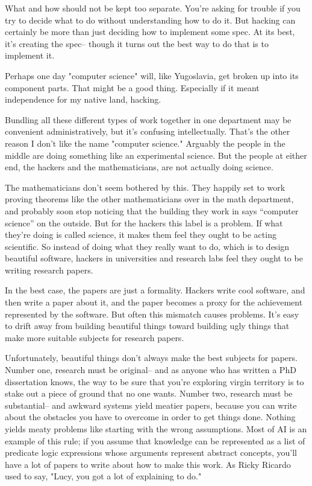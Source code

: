 What and how should not be kept too separate.  You're
asking for trouble if you try to decide what to do without
understanding how to do it.
But hacking can certainly be more than just deciding how to
implement some spec.  At its best, it's creating the spec-- though
it turns out the best way to do that is to implement it.



Perhaps one day
"computer science" will, like Yugoslavia, get broken up into its
component parts.  That might be a good thing.  Especially if it
meant independence for my native land, hacking.

Bundling all these different types of work together in one
department may be convenient administratively, but it's confusing
intellectually. That's the other reason I don't like the name
"computer science."  Arguably the people in the middle are doing
something like an experimental science.  But the people at either
end, the hackers and the mathematicians, are not actually doing science.

The mathematicians don't seem bothered by this.  They happily
set to work proving theorems like the other mathematicians
over in the math department, and probably soon stop noticing
that the building they work in says ``computer science'' on the
outside.  But for the hackers this label is a problem.
If what they're doing is called science, it makes them feel they
ought to be acting scientific.
So instead of doing what they really want to do, which is   
to design beautiful software, hackers in universities and
research labs feel they ought to be writing research papers.

In the best case, the papers are just a formality.  Hackers write
cool software, and then write a paper about it, and the paper
becomes a proxy for the achievement represented by the software.
But often this mismatch causes problems.  It's easy to
drift away from building beautiful things toward building ugly
things that make more suitable subjects for research papers.

Unfortunately, beautiful things don't always make the
best subjects for papers.
Number one, research must be original-- and
as anyone who has written a PhD dissertation knows, the way to
be sure that you're exploring virgin territory is to stake
out a piece of ground that no one wants.  Number two, research must be
substantial-- and awkward systems yield meatier papers,
because you can write about the obstacles you have to overcome
in order to get things done.  Nothing yields meaty problems like
starting with the wrong assumptions.  Most of AI is an example
of this rule; if you assume that knowledge can be represented
as a list of predicate logic expressions whose arguments represent
abstract concepts, you'll have a lot of
papers to write about how to make this work.  As Ricky Ricardo
used to say, "Lucy, you got a lot of explaining to do."

